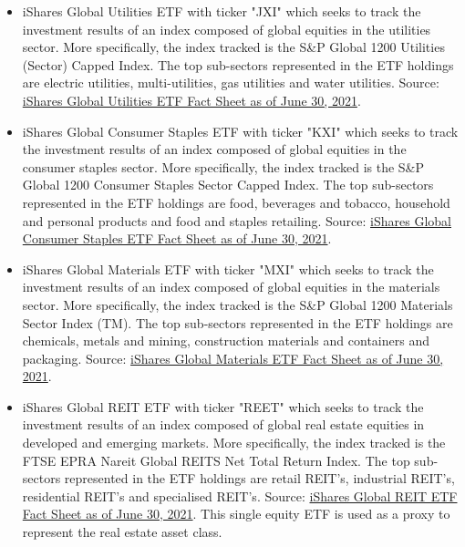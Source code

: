 \begin{itemize}
        \item iShares Global Utilities ETF with ticker "JXI" which seeks to track the investment results of an index composed of global equities in the utilities sector. More specifically, the index tracked is the S{\&}P Global 1200 Utilities (Sector) Capped Index. The top sub-sectors represented in the ETF holdings are electric utilities, multi-utilities, gas utilities and water utilities. Source: \href{https://www.ishares.com/us/literature/fact-sheet/jxi-ishares-global-utilities-etf-fund-fact-sheet-en-us.pdf}{iShares Global Utilities ETF Fact Sheet as of June 30, 2021}.%
        
        \item iShares Global Consumer Staples ETF with ticker "KXI" which seeks to track the investment results of an index composed of global equities in the consumer staples sector. More specifically, the index tracked is the S{\&}P Global 1200 Consumer Staples Sector Capped Index. The top sub-sectors represented in the ETF holdings are food, beverages and tobacco, household and personal products and food and staples retailing. Source: \href{https://www.ishares.com/us/literature/fact-sheet/kxi-ishares-global-consumer-staples-etf-fund-fact-sheet-en-us.pdf}{iShares Global Consumer Staples ETF Fact Sheet as of June 30, 2021}.%
        
        \item iShares Global Materials ETF with ticker "MXI" which seeks to track the investment results of an index composed of global equities in the materials sector. More specifically, the index tracked is the S{\&}P Global 1200 Materials Sector Index (TM). The top sub-sectors represented in the ETF holdings are chemicals, metals and mining, construction materials and containers and packaging. Source: \href{https://www.ishares.com/us/literature/fact-sheet/mxi-ishares-global-materials-etf-fund-fact-sheet-en-us.pdf}{iShares Global Materials ETF Fact Sheet as of June 30, 2021}.%
       
        \item iShares Global REIT ETF with ticker "REET" which seeks to track the investment results of an index composed of global real estate equities in developed and emerging markets. More specifically, the index tracked is the FTSE EPRA Nareit Global REITS Net Total Return Index. The top sub-sectors represented in the ETF holdings are retail REIT's, industrial REIT's, residential REIT's and specialised REIT's. Source: \href{https://www.ishares.com/us/literature/fact-sheet/reet-ishares-global-reit-etf-fund-fact-sheet-en-us.pdf}{iShares Global REIT ETF Fact Sheet as of June 30, 2021}. This single equity ETF is used as a proxy to represent the real estate asset class.%
        

\end{itemize}
